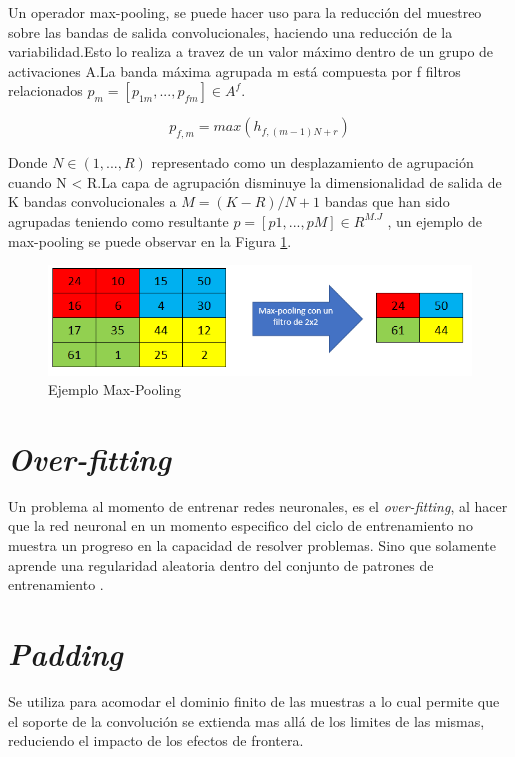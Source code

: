 Un operador max-pooling, se puede hacer uso para la reducción del muestreo sobre las bandas de salida convolucionales, haciendo una reducción de la variabilidad.Esto lo realiza a travez de un valor máximo dentro de un grupo de activaciones A.La banda máxima agrupada m está compuesta por f filtros relacionados $p_{m}=[p_{1m},...,p_{fm}] \in A^f$.

\begin{equation}
	p_{f,m}=max(h_{f,(m-1)N+r})
\end{equation}

Donde $N \in (1,...,R) $ representado como un desplazamiento de agrupación cuando N < R.La capa de agrupación disminuye la dimensionalidad de salida de K bandas convolucionales a $M=(K-R)/N+1$ bandas que han sido agrupadas teniendo como resultante $p=[p1,...,pM] \in R^{M.J}$ \cite{gholamalinezhad2020pooling}, un ejemplo de max-pooling se puede observar en la Figura \ref{mp}.

\begin{figure}[ht]
	\centering
	\includegraphics[scale=0.6]{Figs/mp.png}
	\caption{Ejemplo Max-Pooling}
	\label{mp}
\end{figure}

\section{\textit{Over-fitting}}

Un problema al momento de entrenar redes neuronales, es el \textit{over-fitting}, al hacer que la red neuronal en un momento especifico del ciclo de entrenamiento no muestra un progreso en la capacidad de resolver problemas. Sino que solamente aprende una regularidad aleatoria dentro del conjunto de patrones de entrenamiento \cite{jabbar2015methods}.

\section{\textit{Padding}}

Se utiliza para acomodar el dominio finito de las muestras a lo cual permite que el soporte de la convolución se extienda mas allá de los limites de las mismas, reduciendo el impacto de los efectos de frontera.\\


